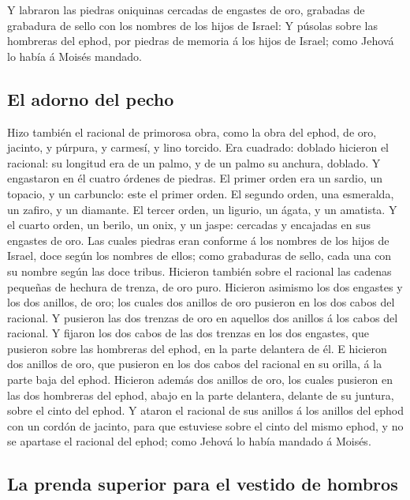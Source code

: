  Y labraron las piedras oniquinas cercadas de engastes de
oro, grabadas de grabadura de sello con los nombres de los hijos de
Israel:  Y púsolas sobre las hombreras del ephod, por
piedras de memoria á los hijos de Israel; como Jehová lo había á Moisés
mandado.

\hypertarget{el-adorno-del-pecho}{%
\subsection{El adorno del pecho}\label{el-adorno-del-pecho}}

 Hizo también el racional de primorosa obra, como la obra
del ephod, de oro, jacinto, y púrpura, y carmesí, y lino torcido.
 Era cuadrado: doblado hicieron el racional: su longitud
era de un palmo, y de un palmo su anchura, doblado.  Y
engastaron en él cuatro órdenes de piedras. El primer orden era un
sardio, un topacio, y un carbunclo: este el primer orden.
 El segundo orden, una esmeralda, un zafiro, y un
diamante.  El tercer orden, un ligurio, un ágata, y un
amatista.  Y el cuarto orden, un berilo, un onix, y un
jaspe: cercadas y encajadas en sus engastes de oro.  Las
cuales piedras eran conforme á los nombres de los hijos de Israel, doce
según los nombres de ellos; como grabaduras de sello, cada una con su
nombre según las doce tribus.  Hicieron también sobre el
racional las cadenas pequeñas de hechura de trenza, de oro puro.
 Hicieron asimismo los dos engastes y los dos anillos, de
oro; los cuales dos anillos de oro pusieron en los dos cabos del
racional.  Y pusieron las dos trenzas de oro en aquellos
dos anillos á los cabos del racional.  Y fijaron los dos
cabos de las dos trenzas en los dos engastes, que pusieron sobre las
hombreras del ephod, en la parte delantera de él.  E
hicieron dos anillos de oro, que pusieron en los dos cabos del racional
en su orilla, á la parte baja del ephod.  Hicieron además
dos anillos de oro, los cuales pusieron en las dos hombreras del ephod,
abajo en la parte delantera, delante de su juntura, sobre el cinto del
ephod.  Y ataron el racional de sus anillos á los anillos
del ephod con un cordón de jacinto, para que estuviese sobre el cinto
del mismo ephod, y no se apartase el racional del ephod; como Jehová lo
había mandado á Moisés.

\hypertarget{la-prenda-superior-para-el-vestido-de-hombros-1}{%
\subsection{La prenda superior para el vestido de
hombros}\label{la-prenda-superior-para-el-vestido-de-hombros-1}}

